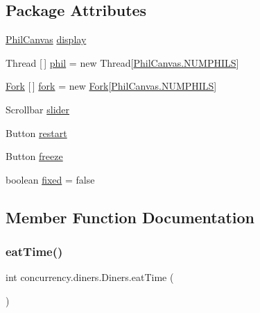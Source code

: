 \subsection*{Package Attributes}
\begin{DoxyCompactItemize}
\item 
\mbox{\hyperlink{classconcurrency_1_1diners_1_1_phil_canvas}{Phil\+Canvas}} \mbox{\hyperlink{classconcurrency_1_1diners_1_1_diners_a89ca881884065b1e357a0556bb1be1fe}{display}}
\item 
Thread \mbox{[}$\,$\mbox{]} \mbox{\hyperlink{classconcurrency_1_1diners_1_1_diners_adf06d18b05e5ad766ef522c1744bee13}{phil}} = new Thread\mbox{[}\mbox{\hyperlink{classconcurrency_1_1diners_1_1_phil_canvas_a3eeb58e8b150bc1715a708ef38171fd5}{Phil\+Canvas.\+N\+U\+M\+P\+H\+I\+LS}}\mbox{]}
\item 
\mbox{\hyperlink{classconcurrency_1_1diners_1_1_fork}{Fork}} \mbox{[}$\,$\mbox{]} \mbox{\hyperlink{classconcurrency_1_1diners_1_1_diners_ab9e7ad456ad4ea3b62cea71de11c147d}{fork}} = new \mbox{\hyperlink{classconcurrency_1_1diners_1_1_fork}{Fork}}\mbox{[}\mbox{\hyperlink{classconcurrency_1_1diners_1_1_phil_canvas_a3eeb58e8b150bc1715a708ef38171fd5}{Phil\+Canvas.\+N\+U\+M\+P\+H\+I\+LS}}\mbox{]}
\item 
Scrollbar \mbox{\hyperlink{classconcurrency_1_1diners_1_1_diners_a39973398065942d8583b0c74d4c2365f}{slider}}
\item 
Button \mbox{\hyperlink{classconcurrency_1_1diners_1_1_diners_abefc470d4d20e4ac1877eca30012b009}{restart}}
\item 
Button \mbox{\hyperlink{classconcurrency_1_1diners_1_1_diners_a3d8a584bc67f1e9bf15ff9236cb078f9}{freeze}}
\item 
boolean \mbox{\hyperlink{classconcurrency_1_1diners_1_1_diners_a4c5e0aefcf719aeed27ca1bb9dca8294}{fixed}} = false
\end{DoxyCompactItemize}


\subsection{Member Function Documentation}
\mbox{\label{classconcurrency_1_1diners_1_1_diners_aa9a143c6257dd6e5c179fc47d53753c6}} 
\subsubsection{\texorpdfstring{eat\+Time()}{eatTime()}}
{\footnotesize\ttfamily int concurrency.\+diners.\+Diners.\+eat\+Time (\begin{DoxyParamCaption}{ }\end{DoxyParamCaption})\hspace{0.3cm}{\ttfamily [inline]}}


